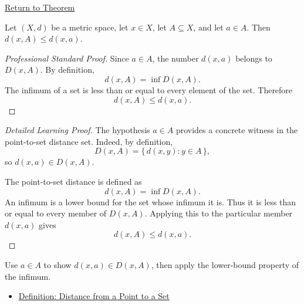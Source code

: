 \newpage
{}
\label{prf:metric-distance-to-set-le-distance-to-point-of-mem}

\begin{remark*}[Return]
\hyperref[thm:metric-distance-to-set-le-distance-to-point-of-mem]{Return to Theorem}
\end{remark*}

\begin{theorem*}
Let \((X,d)\) be a metric space, let \(x\in X\), let \(A\subseteq X\), and let
\(a\in A\).  Then \(d(x,A)\leq d(x,a)\).
\end{theorem*}

\begin{proof}[Professional Standard Proof]
\LRAProofBodyStart
Since \(a\in A\), the number \(d(x,a)\) belongs to \(D(x,A)\).  By definition,
\[
  d(x,A)=\inf D(x,A).
\]
The infimum of a set is less than or equal to every element of the set.
Therefore
\[
  d(x,A)\leq d(x,a).
\]
\end{proof}

\begin{proof}[Detailed Learning Proof]
\LRAProofBodyStart
The hypothesis \(a\in A\) provides a concrete witness in the point-to-set
distance set.  Indeed, by definition,
\[
  D(x,A)=\{\,d(x,y):y\in A\,\},
\]
so \(d(x,a)\in D(x,A)\).

The point-to-set distance is defined as
\[
  d(x,A)=\inf D(x,A).
\]
An infimum is a lower bound for the set whose infimum it is.  Thus it is less
than or equal to every member of \(D(x,A)\).  Applying this to the particular
member \(d(x,a)\) gives
\[
  d(x,A)\leq d(x,a).
\]
\end{proof}

\begin{remark*}
Use \(a\in A\) to show \(d(x,a)\in D(x,A)\), then apply the lower-bound
property of the infimum.
\end{remark*}

\begin{dependencies}
\begin{itemize}
  \item \hyperref[def:metric-point-set-distance]{Definition: Distance from a Point to a Set}
\end{itemize}
\end{dependencies}

\clearpage
